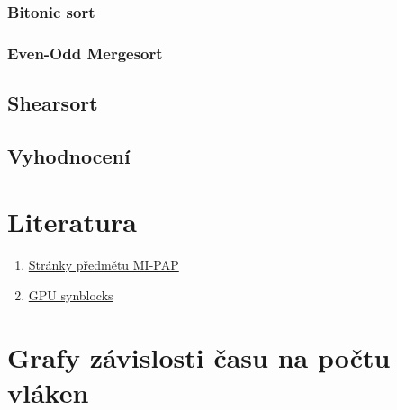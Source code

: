 \documentclass[12pt]{article}
\begin{document}
\subsubsection{Bitonic sort}
\subsubsection{Even-Odd Mergesort}

\subsection{Shearsort}

\subsection{Vyhodnocení}
\section{Literatura}
\begin{enumerate}
\item \href{https://edux.fit.cvut.cz/courses/MI-PAP}{Stránky předmětu MI-PAP}
\item \href{http://aggregate.org/MAGIC/#GPU SyncBlocks}{\label{cud:synblocks}GPU synblocks}
\end{enumerate}


\appendix
\section{Grafy závislosti času na počtu vláken}
\end{document}
